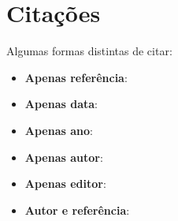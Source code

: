  
 
 
 


\section{Citações}

Algumas formas distintas de citar:

\begin{itemize}
    \item \textbf{Apenas referência}:~\cite{rfc44}
    \item \textbf{Apenas data}:~
    \item \textbf{Apenas ano}:~\citeyear{rfc44}
    \item \textbf{Apenas autor}:~\citeauthor{rfc44}
    \item \textbf{Apenas editor}:
    \item \textbf{Autor e referência}:\citet{rfc44}
\end{itemize}

